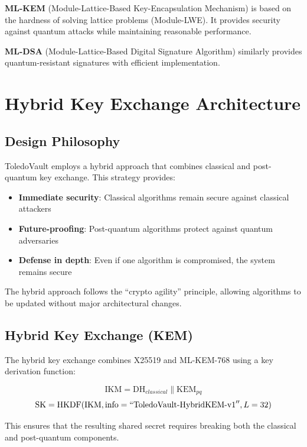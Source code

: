 \documentclass[12pt,a4paper]{article}
\begin{document}
\textbf{ML-KEM} (Module-Lattice-Based Key-Encapsulation Mechanism) is based on the hardness of solving lattice problems (Module-LWE). It provides security against quantum attacks while maintaining reasonable performance.

\textbf{ML-DSA} (Module-Lattice-Based Digital Signature Algorithm) similarly provides quantum-resistant signatures with efficient implementation.

\section{Hybrid Key Exchange Architecture}

\subsection{Design Philosophy}

ToledoVault employs a hybrid approach that combines classical and post-quantum key exchange. This strategy provides:
\begin{itemize}
    \item \textbf{Immediate security}: Classical algorithms remain secure against classical attackers
    \item \textbf{Future-proofing}: Post-quantum algorithms protect against quantum adversaries
    \item \textbf{Defense in depth}: Even if one algorithm is compromised, the system remains secure
\end{itemize}

The hybrid approach follows the ``crypto agility'' principle, allowing algorithms to be updated without major architectural changes.

\subsection{Hybrid Key Exchange (KEM)}

The hybrid key exchange combines X25519 and ML-KEM-768 using a key derivation function:

\begin{equation}
\text{IKM} = \text{DH}_{classical} \| \text{KEM}_{pq}
\end{equation}
\begin{equation}
\text{SK} = \text{HKDF}(\text{IKM}, \text{info}=``\text{ToledoVault-HybridKEM-v1}'', L=32)
\end{equation}

This ensures that the resulting shared secret requires breaking both the classical and post-quantum components.
\end{document}
